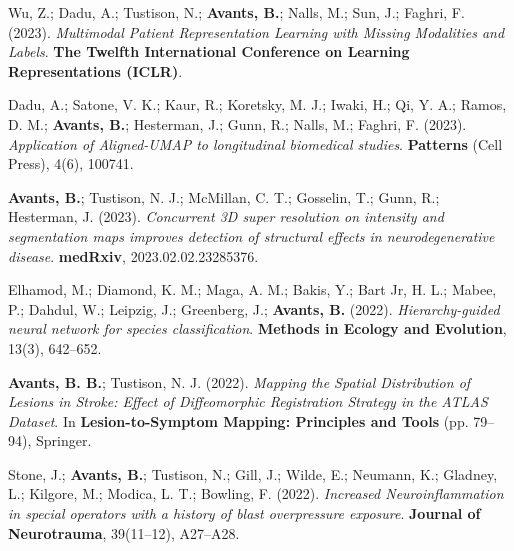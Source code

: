 \documentclass[10pt,letterpaper]{article}
\begin{document}
\begin{enumerate}
{  %
  \item Wu, Z.; Dadu, A.; Tustison, N.; \textbf{Avants, B.}; Nalls, M.; Sun, J.; Faghri, F. (2023). \textit{Multimodal Patient Representation Learning with Missing Modalities and Labels}. \textbf{The Twelfth International Conference on Learning Representations (ICLR)}.
  \item Dadu, A.; Satone, V. K.; Kaur, R.; Koretsky, M. J.; Iwaki, H.; Qi, Y. A.; Ramos, D. M.; \textbf{Avants, B.}; Hesterman, J.; Gunn, R.; Nalls, M.; Faghri, F. (2023). \textit{Application of Aligned-UMAP to longitudinal biomedical studies}. \textbf{Patterns} (Cell Press), 4(6), 100741.
  \item \textbf{Avants, B.}; Tustison, N. J.; McMillan, C. T.; Gosselin, T.; Gunn, R.; Hesterman, J. (2023). \textit{Concurrent 3D super resolution on intensity and segmentation maps improves detection of structural effects in neurodegenerative disease}. \textbf{medRxiv}, 2023.02.02.23285376.

  \item Elhamod, M.; Diamond, K. M.; Maga, A. M.; Bakis, Y.; Bart Jr, H. L.; Mabee, P.; Dahdul, W.; Leipzig, J.; Greenberg, J.; \textbf{Avants, B.} (2022). \textit{Hierarchy-guided neural network for species classification}. \textbf{Methods in Ecology and Evolution}, 13(3), 642--652.
  \item \textbf{Avants, B. B.}; Tustison, N. J. (2022). \textit{Mapping the Spatial Distribution of Lesions in Stroke: Effect of Diffeomorphic Registration Strategy in the ATLAS Dataset}. In \textbf{Lesion-to-Symptom Mapping: Principles and Tools} (pp. 79--94), Springer.
  \item Stone, J.; \textbf{Avants, B.}; Tustison, N.; Gill, J.; Wilde, E.; Neumann, K.; Gladney, L.; Kilgore, M.; Modica, L. T.; Bowling, F. (2022). \textit{Increased Neuroinflammation in special operators with a history of blast overpressure exposure}. \textbf{Journal of Neurotrauma}, 39(11--12), A27--A28.

}
\end{enumerate}
\end{document}
